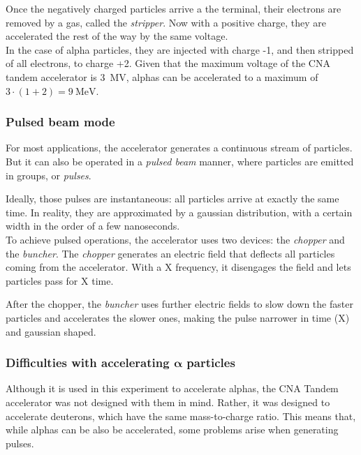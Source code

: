 \documentclass[a4paper,12pt]{report}
\begin{document}
Once the negatively charged particles arrive a the terminal, their electrons are removed by a gas, called the \textit{stripper}.
Now with a positive charge, they are accelerated the rest of the way by the same voltage.
\\

In the case of alpha particles, they are injected with charge -1, and then stripped of all electrons, to charge +2.
Given that the maximum voltage of the CNA tandem accelerator is \qty{3}{\mega\volt}, alphas can be accelerated to a maximum of $3\cdot\left(1+2\right) = \qty{9}{\mega\eV}$.	%
\\

\subsubsection{Pulsed beam mode}
For most applications, the accelerator generates a continuous stream of particles.
But it can also be operated in a \textit{pulsed beam} manner, where particles are emitted in groups, or \textit{pulses}.

Ideally, those pulses are instantaneous: all particles arrive at exactly the same time.
In reality, they are approximated by a gaussian distribution, with a certain width in the order of a few nanoseconds.	%
\\

To achieve pulsed operations, the accelerator uses two devices: the \textit{chopper} and the \textit{buncher}.
The \textit{chopper} generates an electric field that deflects all particles coming from the accelerator.
With a X frequency, it disengages the field and lets particles pass for X time.	%

After the chopper, the \textit{buncher} uses further electric fields to slow down the faster particles and accelerates the slower ones, making the pulse narrower in time (X) and gaussian shaped.	%
\\

\subsubsection{Difficulties with accelerating $\bm{\alpha}$ particles}
Although it is used in this experiment to accelerate alphas, the CNA Tandem accelerator was not designed with them in mind.
Rather, it was designed to accelerate deuterons, which have the same mass-to-charge ratio.
This means that, while alphas can be also be accelerated, some problems arise when generating pulses.
\end{document}
